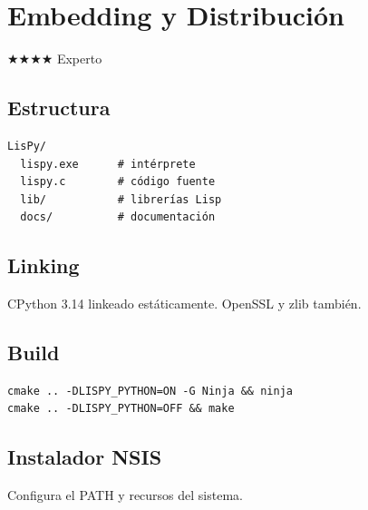 \chapter{Embedding y Distribución}
\label{chap:embedding}
{\huge$\bigstar$}{\huge$\bigstar$}{\huge$\bigstar$}{\huge$\bigstar$} Experto

\section{Estructura}
\begin{verbatim}
LisPy/
  lispy.exe      # intérprete
  lispy.c        # código fuente
  lib/           # librerías Lisp
  docs/          # documentación
\end{verbatim}

\section{Linking}
CPython 3.14 linkeado estáticamente. OpenSSL y zlib también.

\section{Build}
\begin{verbatim}
cmake .. -DLISPY_PYTHON=ON -G Ninja && ninja
cmake .. -DLISPY_PYTHON=OFF && make
\end{verbatim}

\section{Instalador NSIS}
Configura el PATH y recursos del sistema.

